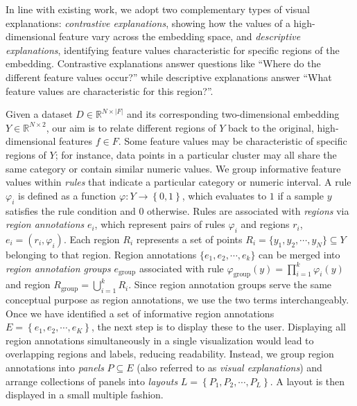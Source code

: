 \documentclass[lettersize,journal]{IEEEtran}
\begin{document}
In line with existing work, we adopt two complementary types of visual explanations: \textit{contrastive explanations}, showing how the values of a high-dimensional feature vary across the embedding space, and \textit{descriptive explanations}, identifying feature values characteristic for specific regions of the embedding.
Contrastive explanations answer questions like ``Where do the different feature values occur?'' while descriptive explanations answer ``What feature values are characteristic for this region?''.

Given a dataset $D \in \mathbb{R}^{N \times |F|}$ and its corresponding two-dimensional embedding $Y \in \mathbb{R}^{N \times 2}$, our aim is to relate different regions of $Y$ back to the original, high-dimensional features $f \in F$.
Some feature values may be characteristic of specific regions of $Y$; for instance, data points in a particular cluster may all share the same category or contain similar numeric values.
We group informative feature values within \textit{rules} that indicate a particular category or numeric interval.
A rule $\varphi_i$ is defined as a function $\varphi: Y \rightarrow \left \{ 0, 1
\right \} $, which evaluates to $1$ if a sample $y$ satisfies the rule condition and $0$ otherwise.
Rules are associated with \textit{regions} via \textit{region annotations} $e_i$, which represent pairs of rules $\varphi_i$ and regions $r_i$, $e_i = \left ( r_i, \varphi_i \right )$.
Each region $R_i$ represents a set of points $R_i = \{ y_1, y_2, \cdots, y_N \} \subseteq Y$ belonging to that region.
Region annotations $\{ e_1, e_2, \cdots, e_k \}$ can be merged into \textit{region annotation groups} $e_{\text{group}}$ associated with rule $\varphi_{\text{group}}(y) = \prod_{i=1}^k \varphi_i(y)$ and region $R_{\text{group}} = \bigcup_{i=1}^{k} R_i$. Since region annotation groups serve the same conceptual purpose as region annotations, we use the two terms interchangeably.
Once we have identified a set of informative region annotations $E = \left \{ e_1, e_2, \cdots, e_K \right \}$, the next step is to display these to the user. Displaying all region annotations simultaneously in a single visualization would lead to overlapping regions and labels, reducing readability.
Instead, we group region annotations into \textit{panels} $P \subseteq E$ (also referred to as \textit{visual explanations}) and arrange collections of panels into \textit{layouts} $L = \left \{ P_1, P_2, \cdots, P_L \right \}$. A layout is then displayed in a small multiple fashion.
\end{document}

